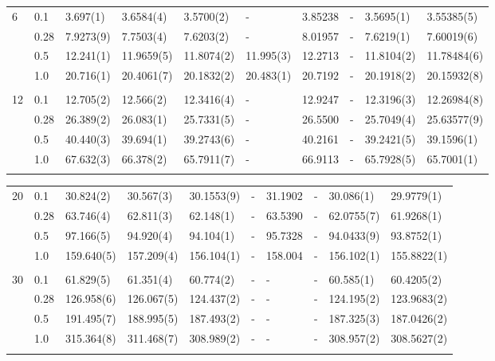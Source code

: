 {\begin{landscape}
\begin{table}
\begin{tabularx}{\hsize}{llR{2.3cm}R{2.3cm}R{2.3cm}R{2.3cm}R{2.3cm}R{2.3cm}R{2.3cm}R{2.3cm}}
		6 & 0.1 & 3.697(1) & 3.6584(4) & 3.5700(2) & - & 3.85238 & - & 3.5695(1) & 3.55385(5) \\ 
		& 0.28 & 7.9273(9) & 7.7503(4) & 7.6203(2) & - & 8.01957 & - & 7.6219(1) & 7.60019(6) \\
		& 0.5 & 12.241(1) & 11.9659(5) & 11.8074(2) & 11.995(3) & 12.2713 & - & 11.8104(2) & 11.78484(6) \\
		& 1.0 & 20.716(1) & 20.4061(7) & 20.1832(2) & 20.483(1) & 20.7192 & - & 20.1918(2) & 20.15932(8) \\ \hdashline \\
		
		12 & 0.1 & 12.705(2) & 12.566(2) & 12.3416(4) & - & 12.9247 & - & 12.3196(3) & 12.26984(8) \\ 
		& 0.28 & 26.389(2) & 26.083(1) & 25.7331(5) & - & 26.5500 & - & 25.7049(4) & 25.63577(9) \\
		& 0.5 & 40.440(3) & 39.694(1) & 39.2743(6) & - & 40.2161 & - & 39.2421(5) & 39.1596(1) \\
		& 1.0 & 67.632(3) & 66.378(2) & 65.7911(7) & - & 66.9113 & - & 65.7928(5) & 65.7001(1) \\ \hdashline
	\end{tabularx}
\end{table}

\begin{table}
	\begin{tabularx}{\hsize}{llR{2.3cm}R{2.3cm}R{2.3cm}R{2.3cm}R{2.3cm}R{2.3cm}R{2.3cm}R{2.3cm}} \\
		\label{tab:quantumdotswinteraction2D2}
		20 & 0.1 & 30.824(2) & 30.567(3) & 30.1553(9) & - & 31.1902 & - & 30.086(1) & 29.9779(1) \\ 
		& 0.28 & 63.746(4) & 62.811(3) & 62.148(1) & - & 63.5390 & - & 62.0755(7) & 61.9268(1) \\
		& 0.5 & 97.166(5) & 94.920(4) & 94.104(1) & - & 95.7328 & - & 94.0433(9) & 93.8752(1) \\
		& 1.0 & 159.640(5) & 157.209(4) & 156.104(1) & - & 158.004 & - & 156.102(1) & 155.8822(1) \\ \hdashline \\
		
		30 & 0.1 & 61.829(5) & 61.351(4) & 60.774(2) & - & - & - & 60.585(1) & 60.4205(2) \\ 
		& 0.28 & 126.958(6) & 126.067(5) & 124.437(2) & - & - & - & 124.195(2) & 123.9683(2) \\
		& 0.5 & 191.495(7) & 188.995(5) & 187.493(2) & - & - & - & 187.325(3) & 187.0426(2) \\
		& 1.0 & 315.364(8) & 311.468(7) & 308.989(2) & - & - & - & 308.957(2) & 308.5627(2) \\ \hdashline \\
		

\end{tabularx}
\end{table}
\end{landscape}}

